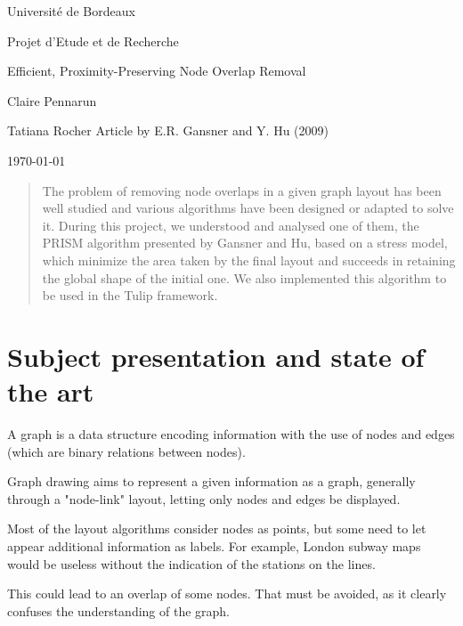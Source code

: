 \documentclass[12pt]{report}
\begin{document}
\begin{titlepage}
\begin{center}

\hfill

\bigskip
\huge{Université de Bordeaux \par \Large Projet d'Etude et de Recherche} 
\vfill
\bigskip 
\Huge 
\bigskip Efficient, Proximity-Preserving Node Overlap Removal \par 
\vfill
\Large Claire Pennarun \par 
		Tatiana Rocher
\vfill
\Large Article by E.R. Gansner and Y. Hu (2009)	
		\bigskip 
\bigskip

\Large
\today
\end{center}
\end{titlepage}

\tableofcontents
\newpage


\begin{abstract}
The problem of removing node overlaps in a given graph layout has been well studied and various algorithms have been designed or adapted to solve it. During this project, we understood and analysed one of them, the PRISM algorithm presented by Gansner and Hu, based on a stress model, which minimize the area taken by the final layout and succeeds in retaining the global shape of the initial one. We also implemented this algorithm to be used in the Tulip framework.
\end{abstract}


\chapter{Subject presentation and state of the art}

A graph is a data structure encoding information with the use of nodes and edges (which are binary relations between nodes).

Graph drawing aims to represent a given information as a graph, generally through a "node-link" layout, letting only nodes and edges be displayed. 

\bigskip
Most of the layout algorithms consider nodes as points, but some need to let appear additional information as labels. For example, London subway maps would be useless without the indication of the stations on the lines.

This could lead to an overlap of some nodes. That must be avoided, as it clearly confuses the understanding of the graph.
\end{document}
